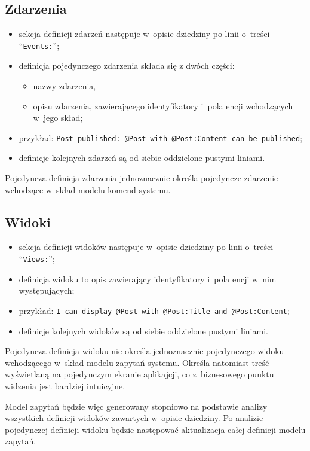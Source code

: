 \subsection{Zdarzenia}

\begin{itemize}
 \item sekcja definicji zdarzeń następuje w~opisie dziedziny po linii o~treści ``\verb|Events:|'';
 \item definicja pojedynczego zdarzenia składa się z dwóch części:
  \begin{itemize}
   \item nazwy zdarzenia,
   \item opisu zdarzenia, zawierającego identyfikatory i~pola encji wchodzących w~jego skład;
  \end{itemize}
 \item przykład: \verb|Post published: @Post with @Post:Content can be published|;
 \item definicje kolejnych zdarzeń są od siebie oddzielone pustymi liniami.
\end{itemize}

Pojedyncza definicja zdarzenia jednoznacznie określa pojedyncze zdarzenie wchodzące w~skład modelu komend systemu.


\subsection{Widoki}

\begin{itemize}
 \item sekcja definicji widoków następuje w~opisie dziedziny po linii o~treści ``\verb|Views:|'';
 \item definicja widoku to opis zawierający identyfikatory i~pola encji w~nim występujących;
 \item przykład: \verb|I can display @Post with @Post:Title and @Post:Content|;
 \item definicje kolejnych widoków są od siebie oddzielone pustymi liniami.
\end{itemize}

Pojedyncza definicja widoku nie określa jednoznacznie pojedynczego widoku wchodzącego w~skład modelu zapytań systemu.
Określa natomiast treść wyświetlaną na pojedynczym ekranie aplikajcji, co z~biznesowego punktu widzenia jest bardziej intuicyjne.

Model zapytań będzie więc generowany stopniowo na podstawie analizy wszystkich definicji widoków zawartych w~opisie dziedziny.
Po analizie pojedynczej definicji widoku będzie następować aktualizacja całej definicji modelu zapytań.

